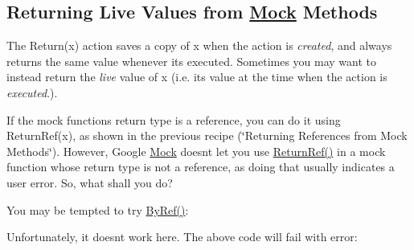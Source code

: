 \begin{DoxyCode}{0}
\DoxyCodeLine{}
\DoxyCodeLine{\};}
\DoxyCodeLine{}
\end{DoxyCode}


\subsection*{Returning Live Values from \mbox{\hyperlink{classMock}{Mock}} Methods}

The {\ttfamily Return(x)} action saves a copy of {\ttfamily x} when the action is {\itshape created}, and always returns the same value whenever it\textquotesingle{}s executed. Sometimes you may want to instead return the {\itshape live} value of {\ttfamily x} (i.\+e. its value at the time when the action is {\itshape executed}.).

If the mock function\textquotesingle{}s return type is a reference, you can do it using {\ttfamily Return\+Ref(x)}, as shown in the previous recipe (\char`\"{}\+Returning References
from Mock Methods\char`\"{}). However, Google \mbox{\hyperlink{classMock}{Mock}} doesn\textquotesingle{}t let you use {\ttfamily \mbox{\hyperlink{namespacetesting_a18eda8fe9c89ee856c199a2e04ca1641}{Return\+Ref()}}} in a mock function whose return type is not a reference, as doing that usually indicates a user error. So, what shall you do?

You may be tempted to try {\ttfamily \mbox{\hyperlink{namespacetesting_aaee6d42dcd69de6e7a1459c5c71222c3}{By\+Ref()}}}\+:


\begin{DoxyCode}{0}
\DoxyCodeLine{}
\DoxyCodeLine{\};}
\end{DoxyCode}


Unfortunately, it doesn\textquotesingle{}t work here. The above code will fail with error\+:


